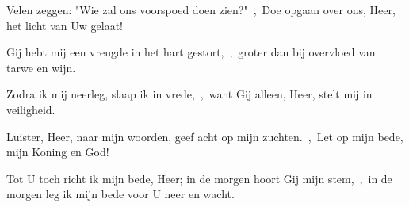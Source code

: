 \documentclass[12pt,twoside,a5paper]{article}
\begin{document}

\begin{halfparskip}
  Velen zeggen: "Wie zal ons voorspoed doen zien?"~\sep\ Doe opgaan over ons, Heer, het licht van Uw gelaat!

  Gij hebt mij een vreugde in het hart gestort,~\sep\ groter dan bij overvloed van tarwe en wijn.

  Zodra ik mij neerleg, slaap ik in vrede,~\sep\ want Gij alleen, Heer, stelt mij in veiligheid.
\end{halfparskip}





\begin{halfparskip}
  Luister, Heer, naar mijn woorden, geef acht op mijn zuchten.~\sep\ Let op mijn bede, mijn Koning en God!


  Tot U toch richt ik mijn bede, Heer; in de morgen hoort Gij mijn stem,~\sep\ in de morgen leg ik mijn bede voor U neer en wacht.
\end{halfparskip}

\end{document}

